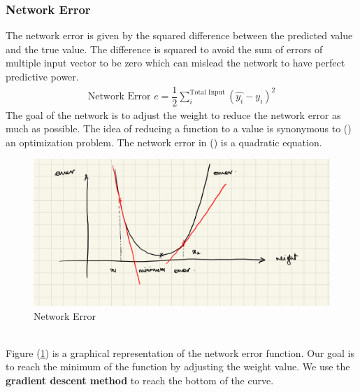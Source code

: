 \subsubsection{Network Error}
The network error is given by the squared difference between the predicted value and the true value. The difference is squared to avoid the sum of errors of multiple input vector to be zero which can mislead the network to have perfect predictive power.
\begin{align}
  \text{Network Error } e = \dfrac{1}{2}\sum^{\text{Total Input}}_i (\widehat{y_i}-y_i)^2
  \label{network_error}
\end{align}
The goal of the network is to adjust the weight to reduce the network error as much as possible. The idea of reducing a function to a value is synonymous to () an optimization problem. The network error in () is a quadratic equation.\\
\begin{figure}[ht]
  \centering
  \includegraphics[scale=0.15]{CHAPTER_2/c2_fig_network_error.jpeg}
  \caption{Network Error}
  \label{network_error_graph}
\end{figure}\vspace{70mm}\\
Figure (\ref*{network_error_graph}) is a graphical representation of the network error function. Our goal is to reach the minimum of the function by adjusting the weight value. We use the \textbf{gradient descent method} to reach the bottom of the curve.
